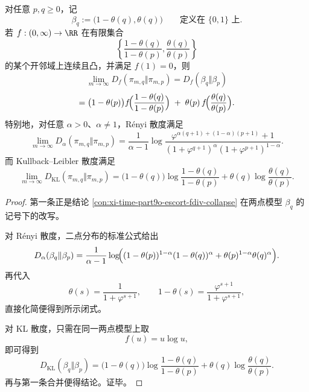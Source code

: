\begin{theorem}\label{thm:xi-time-part9od-escort-escort-fdiv-binary-closure}
对任意 \(p,q\ge 0\)，记
\[
\beta_q:=\bigl(1-\theta(q),\theta(q)\bigr)
\qquad\text{定义在 }\{0,1\}\text{ 上}.
\]
若 \(f:(0,\infty)\to\RR\) 在有限集合
\[
\left\{
\frac{1-\theta(q)}{1-\theta(p)},
\frac{\theta(q)}{\theta(p)}
\right\}
\]
的某个开邻域上连续且凸，并满足 \(f(1)=0\)，则
\[
\lim_{m\to\infty}D_f(\pi_{m,q}\Vert \pi_{m,p})
=
D_f(\beta_q\Vert \beta_p)
\]
\[
=
\bigl(1-\theta(p)\bigr)
f\!\Bigl(\frac{1-\theta(q)}{1-\theta(p)}\Bigr)
\;+\;
\theta(p)\,
f\!\Bigl(\frac{\theta(q)}{\theta(p)}\Bigr).
\]
特别地，对任意 \(\alpha>0\)、\(\alpha\neq 1\)，Rényi 散度满足
\[
\lim_{m\to\infty}D_\alpha(\pi_{m,q}\Vert \pi_{m,p})
=
\frac{1}{\alpha-1}
\log
\frac{\varphi^{\alpha(q+1)+(1-\alpha)(p+1)}+1}
{(1+\varphi^{q+1})^\alpha(1+\varphi^{p+1})^{1-\alpha}}.
\]
而 Kullback--Leibler 散度满足
\[
\lim_{m\to\infty}D_{\mathrm{KL}}(\pi_{m,q}\Vert \pi_{m,p})
=
\bigl(1-\theta(q)\bigr)\log\frac{1-\theta(q)}{1-\theta(p)}
+\theta(q)\log\frac{\theta(q)}{\theta(p)}.
\]
\end{theorem}
\begin{proof}
第一条正是结论 \ref{con:xi-time-part9o-escort-fdiv-collapse} 在两点模型 \(\beta_q\) 的记号下的改写。

对 Rényi 散度，二点分布的标准公式给出
\[
D_\alpha(\beta_q\Vert \beta_p)
=
\frac{1}{\alpha-1}
\log\!\Bigl(
(1-\theta(p))^{1-\alpha}(1-\theta(q))^\alpha
+\theta(p)^{1-\alpha}\theta(q)^\alpha
\Bigr).
\]
再代入
\[
\theta(s)=\frac{1}{1+\varphi^{s+1}},
\qquad
1-\theta(s)=\frac{\varphi^{s+1}}{1+\varphi^{s+1}},
\]
直接化简便得到所示闭式。

对 KL 散度，只需在同一两点模型上取
\[
f(u)=u\log u,
\]
即可得到
\[
D_{\mathrm{KL}}(\beta_q\Vert \beta_p)
=
\bigl(1-\theta(q)\bigr)\log\frac{1-\theta(q)}{1-\theta(p)}
+\theta(q)\log\frac{\theta(q)}{\theta(p)}.
\]
再与第一条合并便得结论。证毕。
\end{proof}

\endinput
